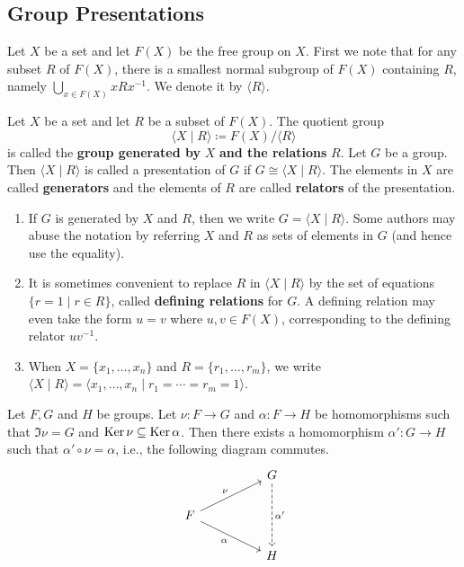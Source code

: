 \subsection{Group Presentations} \label{sec-group-presentations}
Let $X$ be a set and let $F(X)$ be the free group on $X$. First we note that for any subset $R$ of $F(X)$, there is a smallest normal subgroup of $F(X)$ containing $R$, namely $\bigcup_{x\in F(X)} xRx^{-1}$. We denote it by $\langle R\rangle$.
\begin{definition}
	Let $X$ be a set and let $R$ be a subset of $F(X)$. The quotient group $$\langle X\mid R\rangle\coloneq F(X)/\langle R\rangle$$ is called the \textbf{group generated by} $X$ \textbf{and the relations} $R$.  Let $G$ be a group. Then $\langle X\mid R\rangle$ is called a presentation of $G$ if $G\cong\langle X\mid R\rangle$. The elements in $X$ are called \textbf{generators} and the elements of $R$ are called \textbf{relators} of the presentation.
\end{definition} 
\begin{remark}
	\begin{enumerate}[(1)]
		\item If $G$ is generated by $X$ and $R$, then we write $G = \langle X\mid R\rangle$. Some authors may abuse the notation by referring $X$ and $R$ as sets of elements in $G$ (and hence use the equality).
		\item It is sometimes convenient to replace $R$ in $\langle X\mid R\rangle$ by the set of equations $\{r=1\mid r\in R\}$, called \textbf{defining relations} for $G$. A defining relation may even take the form
		$u=v$ where $u,v\in F(X)$, corresponding to the defining relator $uv^{-1}$.
		\item When $X=\{x_1,\dots, x_n\}$ and $R = \{r_1,\dots, r_m\}$, we write $\langle X\mid R\rangle = \langle x_1,\dots, x_n \mid r_1=\cdots = r_m=1 \rangle$.
	\end{enumerate}
\end{remark}
\begin{lemma} \label{lemma-for-von-Dyck}
	Let $F,G$ and $H$ be groups. Let $\nu :F\to G$ and $\alpha:F\to H$ be homomorphisms such that $\Im \nu = G$ and $\operatorname{Ker} \nu \subseteq \operatorname{Ker} \alpha$. Then there exists a homomorphism $\alpha':G\to H$ such that $ \alpha'\circ \nu = \alpha$, i.e., the following diagram commutes.
	\[\begin{tikzcd}
		&& G \\
		F \\
		&& H
		\arrow["{\alpha'}", dashed, from=1-3, to=3-3]
		\arrow["\nu", from=2-1, to=1-3]
		\arrow["\alpha"', from=2-1, to=3-3]
	\end{tikzcd}\]
\end{lemma}

